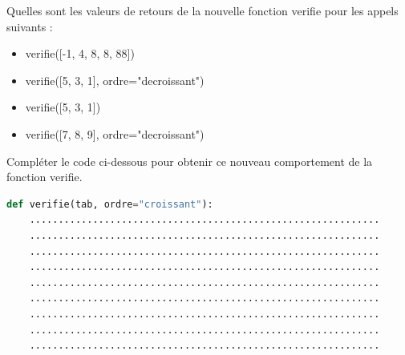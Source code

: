 \begin{Exercise}[title={Vérification tri}]
\Question Quelles sont les valeurs de retours de la nouvelle fonction verifie pour les appels suivants : \\
\begin{itemize}
 \item verifie([-1, 4, 8, 8, 88])
 \item verifie([5, 3, 1], ordre="decroissant")
 \item verifie([5, 3, 1])
 \item verifie([7, 8, 9], ordre="decroissant")
\end{itemize}

\Question Compléter le code ci-dessous pour obtenir ce nouveau comportement de la fonction verifie.

\begin{lstlisting}[language=Python]
def verifie(tab, ordre="croissant"):
    .............................................................
    .............................................................
    .............................................................
    .............................................................
    .............................................................
    .............................................................
    .............................................................
    .............................................................
    .............................................................
\end{lstlisting}
\end{Exercise}